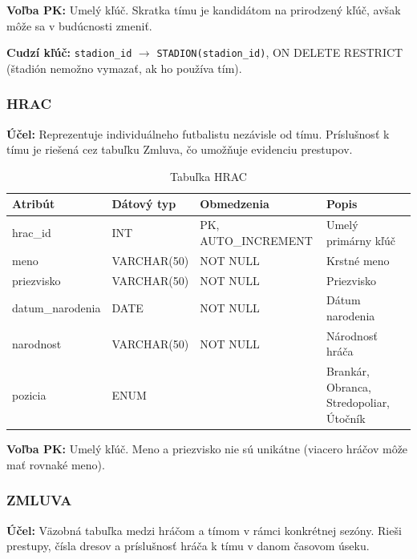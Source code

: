 \documentclass[11pt, a4paper]{article}
\begin{document}
\textbf{Voľba PK:} Umelý kľúč. Skratka tímu je kandidátom na prirodzený kľúč, avšak môže sa v budúcnosti zmeniť.

\textbf{Cudzí kľúč:} \texttt{stadion\_id} $\rightarrow$ \texttt{STADION(stadion\_id)}, ON DELETE RESTRICT (štadión nemožno vymazať, ak ho používa tím).

\subsubsection{HRAC}
\textbf{Účel:} Reprezentuje individuálneho futbalistu nezávisle od tímu. Príslušnosť k tímu je riešená cez tabuľku Zmluva, čo umožňuje evidenciu prestupov.

\begin{table}[H]
    \centering
    \caption{Tabuľka HRAC}
    \label{tab:hrac}
    \begin{tabular}{l l l l}
        \toprule
        \textbf{Atribút} & \textbf{Dátový typ} & \textbf{Obmedzenia} & \textbf{Popis} \\
        \midrule
        hrac\_id         & INT          & PK, AUTO\_INCREMENT & Umelý primárny kľúč \\
        meno             & VARCHAR(50)  & NOT NULL            & Krstné meno \\
        priezvisko       & VARCHAR(50)  & NOT NULL            & Priezvisko \\
        datum\_narodenia & DATE         & NOT NULL            & Dátum narodenia \\
        narodnost        & VARCHAR(50)  & NOT NULL            & Národnosť hráča \\
        pozicia          & ENUM         &                     & Brankár, Obranca, Stredopoliar, Útočník \\
        \bottomrule
    \end{tabular}
\end{table}

\textbf{Voľba PK:} Umelý kľúč. Meno a priezvisko nie sú unikátne (viacero hráčov môže mať rovnaké meno).

\subsubsection{ZMLUVA}
\textbf{Účel:} Väzobná tabuľka medzi hráčom a tímom v rámci konkrétnej sezóny. Rieši prestupy, čísla dresov a príslušnosť hráča k tímu v danom časovom úseku.
\end{document}
